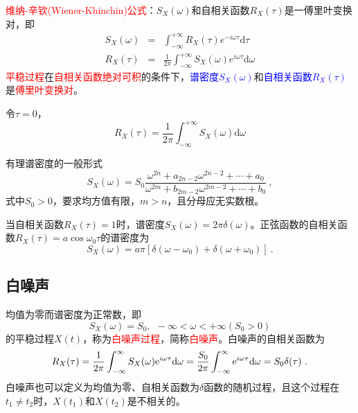 \documentclass[12pt,a4paper]{article}
\newcommand{\dif}{\mathrm{d}}
\begin{document}
\textcolor{red}{维纳-辛钦(Wiener-Khinchin)公式}：$S_X(\omega)$和自相关函数$R_X(\tau)$是一傅里叶变换对，即
\begin{eqnarray}
\nonumber S_X(\omega) &=& \int_{-\infty}^{+\infty}  R_X(\tau) e^{-i\omega \tau} \dif \tau \\
R_X(\tau) &=& \frac{1}{2\pi}  \int_{-\infty}^{+\infty}  S_X(\omega) e^{i\omega \tau} \dif \omega
\end{eqnarray}
\textcolor{red}{平稳过程}在\textcolor{red}{自相关函数绝对可积}的条件下，\textcolor{blue}{谱密度$S_X(\omega)$}和\textcolor{blue}{自相关函数$R_X(\tau)$}是\textcolor{red}{傅里叶变换对}。

令$\tau = 0$，
\begin{equation}
R_X(\tau) = \frac{1}{2\pi}  \int_{-\infty}^{+\infty}  S_X(\omega) \dif \omega
\end{equation}

有理谱密度的一般形式
\begin{equation}
S_X(\omega) = S_0 \dfrac{\omega^{2n} +a_{2n-2} \omega^{2n-2} +\cdots + a_0}{\omega^{2m} +b_{2m-2} \omega^{2m-2} +\cdots + b_0} ~,
\end{equation}
式中$S_0 > 0$，要求均方值有限，$m > n$，且分母应无实数根。


当自相关函数$R_X(\tau) = 1$时，谱密度$S_X(\omega) = 2\pi \delta(\omega)$。正弦函数的自相关函数$R_X(\tau) = a\cos \omega_0 \tau$的谱密度为
\begin{equation}
S_X(\omega) = a\pi [\delta(\omega -\omega_0) +\delta(\omega +\omega_0) ] ~.
\end{equation}



\subsection{白噪声}
均值为零而谱密度为正常数，即
\begin{equation*}
S_X(\omega) = S_0, ~~ -\infty < \omega < +\infty (S_0 > 0)
\end{equation*}
的平稳过程$X(t)$，称为\textcolor{red}{白噪声过程}，简称\textcolor{red}{白噪声}。白噪声的自相关函数为
\begin{equation*}
R_X(\tau) = \dfrac{1}{2\pi} \int_{-\infty}^\infty S_X(\omega) {\rm e}^{i\omega \tau} \dif \omega = \dfrac{S_0}{2\pi} \int_{-\infty}^\infty {\rm e}^{i\omega \tau} \dif \omega = S_0 \delta(\tau) ~.
\end{equation*}
白噪声也可以定义为均值为零、自相关函数为$\delta$函数的随机过程，且这个过程在$t_1 \neq t_2$时，$X(t_1)$和$X(t_2)$是不相关的。
\end{document}
